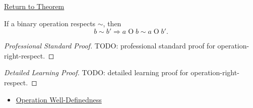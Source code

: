 \newpage
{}
\label{prf:operation-right-respect}

\begin{remark*}[Return]
\hyperref[lem:operation-right-respect]{Return to Theorem}
\end{remark*}

\begin{lemma*}
If a binary operation respects $\sim$, then
\[
b\sim b' \Longrightarrow a\mathbin{O}b\sim a\mathbin{O}b'.
\]
\end{lemma*}

\begin{proof}[Professional Standard Proof]
\LRAProofBodyStart
TODO: professional standard proof for operation-right-respect.
\end{proof}

\begin{proof}[Detailed Learning Proof]
\LRAProofBodyStart
TODO: detailed learning proof for operation-right-respect.
\end{proof}

\begin{remark*}
\end{remark*}

\begin{dependencies}
\begin{itemize}
  \item \hyperref[def:operation-well-definedness]{Operation Well-Definedness}
\end{itemize}
\end{dependencies}

\clearpage
